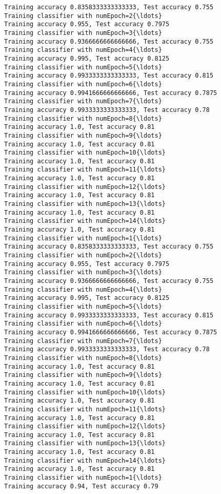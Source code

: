 \documentclass[11pt]{article}
\begin{document}
\begin{Verbatim}[commandchars=\\\{\}]
Training accuracy 0.8358333333333333, Test accuracy 0.755
Training classifier with numEpoch=2{\ldots}
Training accuracy 0.955, Test accuracy 0.7975
Training classifier with numEpoch=3{\ldots}
Training accuracy 0.9366666666666666, Test accuracy 0.755
Training classifier with numEpoch=4{\ldots}
Training accuracy 0.995, Test accuracy 0.8125
Training classifier with numEpoch=5{\ldots}
Training accuracy 0.9933333333333333, Test accuracy 0.815
Training classifier with numEpoch=6{\ldots}
Training accuracy 0.9941666666666666, Test accuracy 0.7875
Training classifier with numEpoch=7{\ldots}
Training accuracy 0.9933333333333333, Test accuracy 0.78
Training classifier with numEpoch=8{\ldots}
Training accuracy 1.0, Test accuracy 0.81
Training classifier with numEpoch=9{\ldots}
Training accuracy 1.0, Test accuracy 0.81
Training classifier with numEpoch=10{\ldots}
Training accuracy 1.0, Test accuracy 0.81
Training classifier with numEpoch=11{\ldots}
Training accuracy 1.0, Test accuracy 0.81
Training classifier with numEpoch=12{\ldots}
Training accuracy 1.0, Test accuracy 0.81
Training classifier with numEpoch=13{\ldots}
Training accuracy 1.0, Test accuracy 0.81
Training classifier with numEpoch=14{\ldots}
Training accuracy 1.0, Test accuracy 0.81
Training classifier with numEpoch=1{\ldots}
Training accuracy 0.8358333333333333, Test accuracy 0.755
Training classifier with numEpoch=2{\ldots}
Training accuracy 0.955, Test accuracy 0.7975
Training classifier with numEpoch=3{\ldots}
Training accuracy 0.9366666666666666, Test accuracy 0.755
Training classifier with numEpoch=4{\ldots}
Training accuracy 0.995, Test accuracy 0.8125
Training classifier with numEpoch=5{\ldots}
Training accuracy 0.9933333333333333, Test accuracy 0.815
Training classifier with numEpoch=6{\ldots}
Training accuracy 0.9941666666666666, Test accuracy 0.7875
Training classifier with numEpoch=7{\ldots}
Training accuracy 0.9933333333333333, Test accuracy 0.78
Training classifier with numEpoch=8{\ldots}
Training accuracy 1.0, Test accuracy 0.81
Training classifier with numEpoch=9{\ldots}
Training accuracy 1.0, Test accuracy 0.81
Training classifier with numEpoch=10{\ldots}
Training accuracy 1.0, Test accuracy 0.81
Training classifier with numEpoch=11{\ldots}
Training accuracy 1.0, Test accuracy 0.81
Training classifier with numEpoch=12{\ldots}
Training accuracy 1.0, Test accuracy 0.81
Training classifier with numEpoch=13{\ldots}
Training accuracy 1.0, Test accuracy 0.81
Training classifier with numEpoch=14{\ldots}
Training accuracy 1.0, Test accuracy 0.81
Training classifier with numEpoch=1{\ldots}
Training accuracy 0.94, Test accuracy 0.79

\end{Verbatim}
\end{document}
